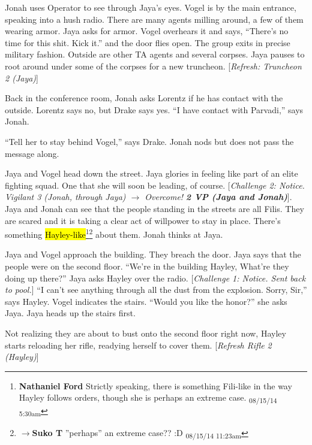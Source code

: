 Jonah uses Operator to see through Jaya's eyes.  Vogel is by the main entrance, speaking into a hush radio.  There are many agents milling around, a few of them wearing armor.  Jaya asks for armor.  Vogel overhears it and says, ``There's no time for this shit.  Kick it.'' and the door flies open.  The group exits in precise military fashion.  Outside are other TA agents and several corpses.  Jaya pauses to root around under some of the corpses for a new truncheon.  {[}\textit{Refresh: Truncheon 2 (Jaya)}{]}



Back in the conference room, Jonah asks Lorentz if he has contact with the outside.  Lorentz says no, but Drake says yes.  ``I have contact with Parvadi,'' says Jonah.  

``Tell her to stay behind Vogel,'' says Drake.   Jonah nods but does not pass the message along.



Jaya and Vogel head down the street.  Jaya glories in feeling like part of an elite fighting squad.  One that she will soon be leading, of course. {[}\textit{Challenge 2: Notice.  Vigilant 3 (Jonah, through Jaya) $\rightarrow$ Overcome! }\textit{\textbf{2 VP (Jaya and Jonah)}}{]}.  Jaya and Jonah can see that the people standing in the streets are all Filis.  They are scared and it is taking a clear act of willpower to stay in place.  There's something \hl{Hayley-like}\footnote{\textbf{Nathaniel Ford }Strictly speaking, there is something Fili-like in the way Hayley follows orders, though she is perhaps an extreme case. \textsubscript{08/15/14 5:30am}}\footnote{$\rightarrow$\textbf{Suko T }''perhaps'' an extreme case?? :D \textsubscript{08/15/14 11:23am}} about them.     Jonah thinks at Jaya.



Jaya and Vogel approach the building.  They breach the door.  Jaya says that the people were on the second floor.  ``We're in the building Hayley, What're they doing up there?'' Jaya asks Hayley over the radio.   {[}\textit{Challenge 1: Notice.  Sent back to pool.}{]}  ``I can't see anything through all the dust from the explosion.  Sorry, Sir,'' says Hayley.   Vogel indicates the stairs.  ``Would you like the honor?'' she asks Jaya.  Jaya heads up the stairs first.



Not realizing they are about to bust onto the second floor right now, Hayley starts reloading her rifle, readying herself to cover them.  {[}\textit{Refresh Rifle 2 (Hayley)}{]}




